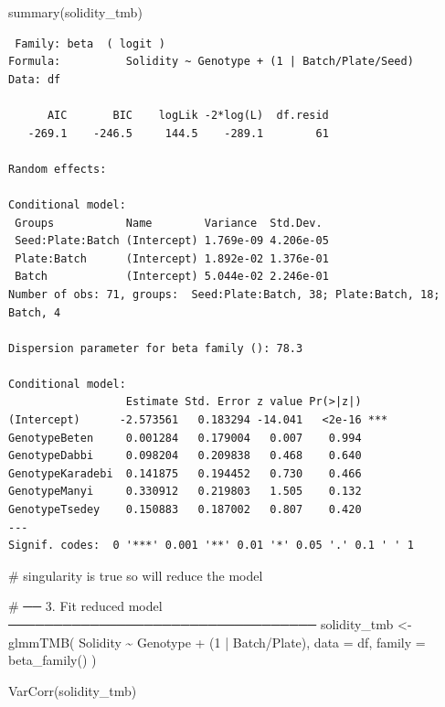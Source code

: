 \documentclass[
  letterpaper,
  DIV=11,
  numbers=noendperiod]{scrartcl}
\newenvironment{Shaded}{\begin{snugshade}}{\end{snugshade}}
\newcommand{\AttributeTok}[1]{\textcolor[rgb]{0.40,0.45,0.13}{#1}}
\newcommand{\CommentTok}[1]{\textcolor[rgb]{0.37,0.37,0.37}{#1}}
\newcommand{\DecValTok}[1]{\textcolor[rgb]{0.68,0.00,0.00}{#1}}
\newcommand{\FunctionTok}[1]{\textcolor[rgb]{0.28,0.35,0.67}{#1}}
\newcommand{\NormalTok}[1]{\textcolor[rgb]{0.00,0.23,0.31}{#1}}
\newcommand{\OtherTok}[1]{\textcolor[rgb]{0.00,0.23,0.31}{#1}}
\newcommand{\SpecialCharTok}[1]{\textcolor[rgb]{0.37,0.37,0.37}{#1}}
\begin{document}
\begin{Shaded}
\begin{Highlighting}[]
\FunctionTok{summary}\NormalTok{(solidity\_tmb)}
\end{Highlighting}
\end{Shaded}

\begin{verbatim}
 Family: beta  ( logit )
Formula:          Solidity ~ Genotype + (1 | Batch/Plate/Seed)
Data: df

      AIC       BIC    logLik -2*log(L)  df.resid 
   -269.1    -246.5     144.5    -289.1        61 

Random effects:

Conditional model:
 Groups           Name        Variance  Std.Dev. 
 Seed:Plate:Batch (Intercept) 1.769e-09 4.206e-05
 Plate:Batch      (Intercept) 1.892e-02 1.376e-01
 Batch            (Intercept) 5.044e-02 2.246e-01
Number of obs: 71, groups:  Seed:Plate:Batch, 38; Plate:Batch, 18; Batch, 4

Dispersion parameter for beta family (): 78.3 

Conditional model:
                  Estimate Std. Error z value Pr(>|z|)    
(Intercept)      -2.573561   0.183294 -14.041   <2e-16 ***
GenotypeBeten     0.001284   0.179004   0.007    0.994    
GenotypeDabbi     0.098204   0.209838   0.468    0.640    
GenotypeKaradebi  0.141875   0.194452   0.730    0.466    
GenotypeManyi     0.330912   0.219803   1.505    0.132    
GenotypeTsedey    0.150883   0.187002   0.807    0.420    
---
Signif. codes:  0 '***' 0.001 '**' 0.01 '*' 0.05 '.' 0.1 ' ' 1
\end{verbatim}

\begin{Shaded}
\begin{Highlighting}[]
\CommentTok{\# singularity is true so will reduce the model }

\CommentTok{\# ── 3. Fit reduced model ──────────────────────────────────}
\NormalTok{solidity\_tmb }\OtherTok{\textless{}{-}} \FunctionTok{glmmTMB}\NormalTok{(}
\NormalTok{  Solidity }\SpecialCharTok{\textasciitilde{}}\NormalTok{ Genotype }\SpecialCharTok{+}\NormalTok{ (}\DecValTok{1} \SpecialCharTok{|}\NormalTok{ Batch}\SpecialCharTok{/}\NormalTok{Plate),}
  \AttributeTok{data =}\NormalTok{ df, }\AttributeTok{family =} \FunctionTok{beta\_family}\NormalTok{()}
\NormalTok{)}

\FunctionTok{VarCorr}\NormalTok{(solidity\_tmb)}
\end{Highlighting}
\end{Shaded}
\end{document}

